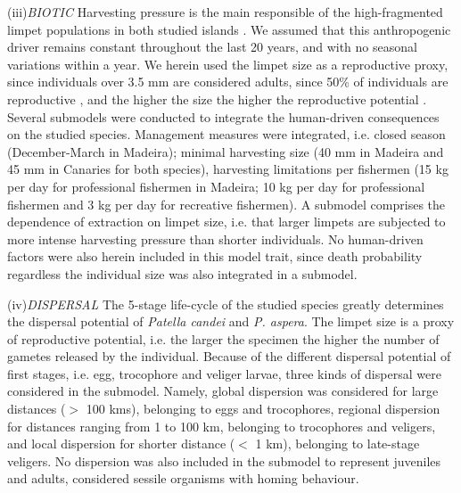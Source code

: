 \documentclass[12pt]{article}
\begin{document}
\begin{justify}
{{{{{(iii)\textit{BIOTIC}
Harvesting pressure is the main responsible of the high-fragmented limpet populations in both studied islands \citep{riera2016clear,sousa2019long}. We assumed that this anthropogenic driver remains constant throughout the last 20 years, and with no seasonal variations within a year. We herein used the limpet size as a reproductive proxy, since individuals over 3.5 mm are considered adults, since 50\% of individuals are reproductive \citep{henriques2012life}, and the higher the size the higher the reproductive potential \citep{boaventura2002analysis, martins2017exploitation}. Several submodels were conducted to integrate the human-driven consequences on the studied species. Management measures were integrated, i.e. closed season (December-March in Madeira); minimal harvesting size (40 mm in Madeira and 45 mm in Canaries for both species), harvesting limitations per fishermen (15 kg per day for professional fishermen in Madeira; 10 kg per day for professional fishermen and 3 kg per day for recreative fishermen). A submodel comprises the dependence of extraction on limpet size, i.e. that larger limpets are subjected to more intense harvesting pressure than shorter individuals.
No human-driven factors were also herein included in this model trait, since death probability regardless the individual size was also integrated in a submodel.

(iv)\textit{DISPERSAL}
The 5-stage life-cycle of the studied species greatly determines the dispersal potential of \textit{Patella candei} and \textit{P. aspera}. The limpet size is a proxy of reproductive potential, i.e. the larger the specimen the higher the number of gametes released by the individual. Because of the different dispersal potential of first stages, i.e. egg, trocophore and veliger larvae, three kinds of dispersal were considered in the submodel. Namely, global dispersion was considered for large distances ($>$ 100 kms), belonging to eggs and trocophores, regional dispersion for distances ranging from 1 to 100 km, belonging to trocophores and veligers, and local dispersion for shorter distance ($<$ 1 km), belonging to late-stage veligers. No dispersion was also included in the submodel to represent juveniles and adults, considered sessile organisms with homing behaviour.

}}}}}
\end{justify}
\end{document}
